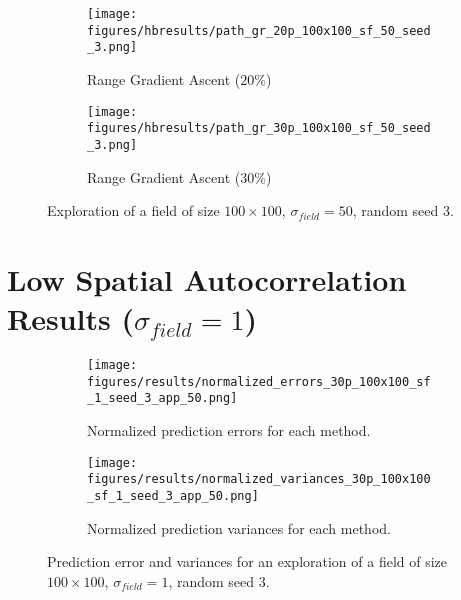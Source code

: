 \begin{figure}[htb!]
\begin{subfigure}[t]{0.32\textwidth}
        \centering
        \texttt{[image: figures/hbresults/path\_gr\_20p\_100x100\_sf\_50\_seed\_3.png]}
        \ssp
        \captionsetup{skip=0.20\baselineskip,size=footnotesize}
        \caption{Range Gradient Ascent ($20\%$)}
    \end{subfigure}%
    \begin{subfigure}[t]{0.32\textwidth}
        \centering
        \texttt{[image: figures/hbresults/path\_gr\_30p\_100x100\_sf\_50\_seed\_3.png]}
        \ssp
        \captionsetup{skip=0.20\baselineskip,size=footnotesize}
        \caption{Range Gradient Ascent ($30\%$)}
    \end{subfigure}%
    \ssp
    \captionsetup{skip=0.20\baselineskip}
    \caption{Exploration of a field of size $100 \times 100$, $\sigma_{field} = 50$, random seed 3.}
    \label{fig:s3_sf50}
\end{figure}

\FloatBarrier
\clearpage

\section{Low Spatial Autocorrelation Results ($\sigma_{field} = 1$)} \label{sec:s3_sigma1}

\begin{figure}[htb!]
    \centering
    \begin{subfigure}[t]{0.5\textwidth}
        \centering
        \texttt{[image: figures/results/normalized\_errors\_30p\_100x100\_sf\_1\_seed\_3\_app\_50.png]}
        \ssp
        \captionsetup{skip=0.20\baselineskip,size=footnotesize}
        \caption{Normalized prediction errors for each method.}
    \end{subfigure}%
    \begin{subfigure}[t]{0.5\textwidth}
        \centering
        \texttt{[image: figures/results/normalized\_variances\_30p\_100x100\_sf\_1\_seed\_3\_app\_50.png]}
        \ssp
        \captionsetup{skip=0.20\baselineskip,size=footnotesize}
        \caption{Normalized prediction variances for each method.}
    \end{subfigure}%
    \ssp
    \captionsetup{skip=0.20\baselineskip}
    \caption{Prediction error and variances for an exploration of a field of size $100 \times 100$, $\sigma_{field} = 1$, random seed 3.}
    \label{fig:s3_errvar1}
\end{figure}

